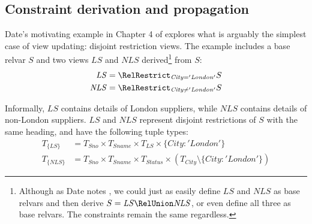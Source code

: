\documentclass{sig-alternate-05-2015}
\newcounter{constraint}
\newcommand{\LS}{\ensuremath{\mathit{LS}}}
\newcommand{\NLS}{\ensuremath{\mathit{NLS}}}
\newcommand{\Sno}{\ensuremath{\mathit{Sno}}}
\newcommand{\Sname}{\ensuremath{\mathit{Sname}}}
\newcommand{\Status}{\ensuremath{\mathit{Status}}}
\newcommand{\City}{\ensuremath{\mathit{City}}}
\newcommand{\T}[1]{\ensuremath{T_{#1}}}
\newcommand{\TT}[1]{\ensuremath{T_{\{#1\}}}}
\newcommand{\CityLondon}{\ensuremath{\{\City\colon\allowbreak\mathit{'London'}\}}}
\newcommand{\TCityMinusLondon}{\ensuremath{\T{\City} \setminus \CityLondon}}
\begin{document}


\subsection{Constraint derivation and propagation}
\label{sec-constraints}

\noindent Date's motivating example in Chapter 4 of \cite{Date.C-2013a-View} explores what is arguably the simplest case of view updating: disjoint restriction views. The example includes a base relvar \(S\) and two views \(\LS\) and \(\NLS\) derived\footnote{Although as Date notes \cite{Date.C-2013a-View}, we could just as easily define \(\LS\) and \(\NLS\) as base relvars and then derive \(S = \LS \RelUnion \NLS\), or even define all three as base relvars. The constraints remain the same regardless.} from \(S\):
\begin{align}
    \LS  &= \RelRestrict_{\City = \mathit{'London'}}S \label{eqn-ls}   \\
    \NLS &= \RelRestrict_{\City \ne \mathit{'London'}}S \label{eqn-nls}
\end{align}

Informally, \(\LS\) contains details of London suppliers, while \(\NLS\) contains details of non-London suppliers. \(\LS\) and  \(\NLS\) represent disjoint restrictions of \(S\) with the same heading, and have the following tuple types:
\begin{align}
    \TT{\LS}  &= \T{\Sno} \times \T{\Sname} \times \T{\LS} \times \CityLondon \nonumber    \\
    \TT{\NLS} &= \T{\Sno} \times \T{\Sname} \times \T{\Status} \times (\TCityMinusLondon) \nonumber
\end{align}
\end{document}
